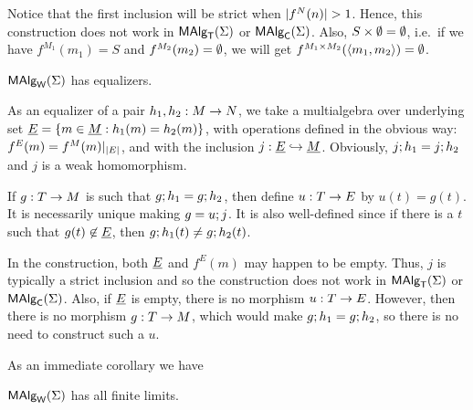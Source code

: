 \documentclass[10pt]{article}
\begin{document}
\noindent
Notice that the first inclusion will be strict when
$\Card{f^N(n)}>1$. Hence, this construction does not work in $\mbox{\rm\sf MAlg}_{\sf T}(\Sigma)$
or $\mbox{\rm\sf MAlg}_{\sf C}(\Sigma)$. Also, $S\times\emptyset=\emptyset$, i.e.\ if we have
$f^{M_{1}}(m_1)=S$ and $f^{M_{2}}(m_2)=\emptyset$, we will get
$f^{M_{1}\times M_{2}}(\langle m_1,m_2\rangle)=\emptyset$.

\begin{Lemma}
$\mbox{\rm\sf MAlg}_{\sf W}(\Sigma)$ has equalizers.
\end{Lemma}

\begin{Proof}
As an equalizer of a pair $h_1,h_2:M\rightarrow N$, we take a multialgebra
over underlying set $\underline {E} = \{m\in\underline {M}:h_1(m)=h_2(m)\}$, with
operations defined in the obvious way: $f^E(m)=f^M(m)|_{|E|}$, and
with the inclusion $j:\underline {E} \hookrightarrow \underline {M}$.  Obviously, $j;h_1=j;h_2$ and $j$ is a weak homomorphism.

If $g:T\rightarrow M$ is such that $g;h_1=g;h_2$, then define
$u:T\rightarrow E$ by $u(t)=g(t)$. It is necessarily unique making $g=u;j$. It is also well-defined since if there is a $t$ such that
$g(t)\not\in \underline {E}$, then $g;h_1(t)\not=g;h_2(t)$.
\end{Proof}

\noindent
In the construction, both $\underline {E}$ and $f^E(m)$ may happen to be
empty. Thus, $j$ is typically a strict inclusion and so the
construction does not work in $\mbox{\rm\sf MAlg}_{\sf T}(\Sigma)$ or $\mbox{\rm\sf MAlg}_{\sf C}(\Sigma)$. Also, if $\underline {E}$
is empty, there is no morphism $u:T\rightarrow E$. However, then there is no
morphism $g:T\rightarrow M$, which would make $g;h_1=g;h_2$,
so there is no need to construct such a $u$.


As an immediate corollary we have

\begin{Theorem}\label{th:MASlcmpl}
$\mbox{\rm\sf MAlg}_{\sf W}(\Sigma)$ has all finite limits.
\end{Theorem}

% 
\end{document}
